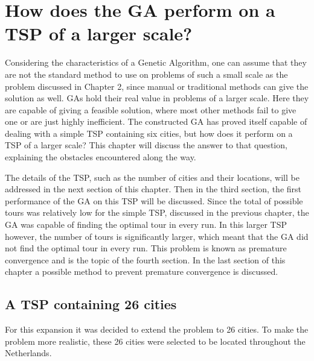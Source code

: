 \section{How does the GA perform on a TSP of a larger scale?}

\par
Considering the characteristics of a Genetic Algorithm, one can assume that they are not the standard method to use on problems of such a small scale as the problem discussed in Chapter 2, since manual or traditional methods can give the solution as well. GAs hold their real value in problems of a larger scale. Here they are capable of giving a feasible solution, where most other methods fail to give one or are just highly inefficient. The constructed GA has proved itself capable of dealing with a simple TSP containing six cities, but how does it perform on a TSP of a larger scale? This chapter will discuss the answer to that question, explaining the obstacles encountered along the way.
\par
The details of the TSP, such as the number of cities and their locations, will be addressed in the next section of this chapter. Then in the third section, the first performance of the GA on this TSP will be discussed. Since the total of possible tours was relatively low for the simple TSP, discussed in the previous chapter, the GA was capable of finding the optimal tour in every run. In this larger TSP however, the number of tours is significantly larger, which meant that the GA did not find the optimal tour in every run. This problem is known as premature convergence and is the topic of the fourth section. In the last section of this chapter a possible method to prevent premature convergence is discussed.

\subsection{A TSP containing 26 cities} %
\par
For this expansion it was decided to extend the problem to 26 cities. To make the problem more realistic, these 26 cities were selected to be located throughout the Netherlands. 


